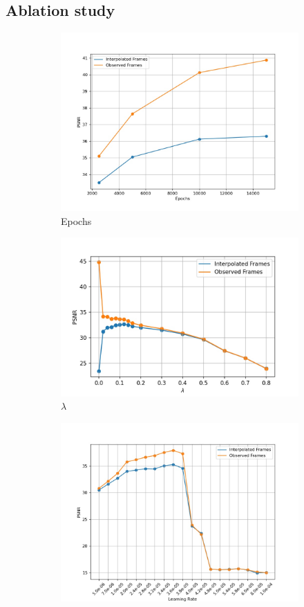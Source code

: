 \documentclass{article}
\begin{document}
\subsection{Ablation study}
\label{sec_abl}

\begin{figure}
\centering
\begin{subfigure}{1\textwidth}
	\centering
    \includegraphics[width=0.6\linewidth]{Epochs.jpg}
    \caption{Epochs}
\end{subfigure}
\begin{subfigure}{0.6\textwidth}
	\centering
    \includegraphics[width=1\linewidth]{lambda.jpg}
	\caption{$\lambda$}
\end{subfigure}%
\begin{subfigure}{0.6\textwidth}
\centering
    \includegraphics[width=1\linewidth]{LR.jpg}

\end{subfigure}
\end{figure}
\end{document}
